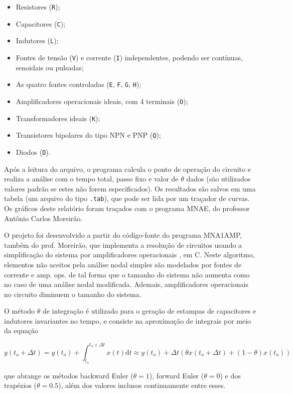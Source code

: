 \documentclass[11pt,titlepage]{article}
\begin{document}
\begin{itemize}[noitemsep]
    \item Resistores (\texttt{R});
    \item Capacitores (\texttt{C});
    \item Indutores (\texttt{L});
    \item Fontes de tensão (\texttt{V}) e corrente (\texttt{I}) independentes, podendo ser contínuas, senoidais ou pulsadas;
    \item As quatro fontes controladas (\texttt{E}, \texttt{F}, \texttt{G}, \texttt{H});
    \item Amplificadores operacionais ideais, com 4 terminais (\texttt{O});
    \item Transformadores ideais (\texttt{K});
    \item Transistores bipolares do tipo NPN e PNP (\texttt{Q});
    \item Diodos (\texttt{D}).
\end{itemize}

Após a leitura do arquivo, o programa calcula o ponto de operação do circuito e realiza a análise com o tempo total, passo fixo e valor de $\theta$ dados (são utilizados valores padrão se estes não forem especificados). Os resultados são salvos em uma tabela (um arquivo do tipo \texttt{.tab}), que pode ser lida por um traçador de curvas. Os gráficos deste relatório foram traçados com o programa MNAE, do professor Antônio Carlos Moreirão.

O projeto foi desenvolvido a partir do código-fonte do programa MNA1AMP, também do prof. Moreirão, que implementa a resolução de circuitos usando a simplificação do sistema por amplificadores operacionais \cite{apostilaCEII}, em C. Neste algoritmo, elementos não aceitos pela análise nodal simples são modelados por fontes de corrente e amp. ops. de tal forma que o tamanho do sistema não aumenta como no caso de uma análise nodal modificada. Ademais, amplificadores operacionais no circuito diminuem o tamanho do sistema.

O \textquotedbl método $\theta$\textquotedbl{} de integração é utilizado para o geração de estampas de capacitores e indutores invariantes no tempo, e consiste na aproximação de integrais por meio da equação

$$y(t_o + \Delta t) = y(t_o) + \int_{t_o}^{t_o + \Delta t}x(t)\mathrm{d}t \approx y(t_o) + \Delta t (\theta x(t_o + \Delta t) + (1 - \theta)x(t_o))$$

que abrange os métodos \textquotedbl backward Euler\textquotedbl{} ($\theta = 1$), \textquotedbl forward Euler\textquotedbl{} ($\theta = 0$) e dos trapézios ($\theta = 0.5$), além dos valores inclusos continuamente entre esses.
\end{document}
